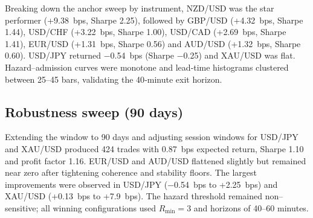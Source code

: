 \documentclass[11pt]{article}
\begin{document}
Breaking down the anchor sweep by instrument, NZD/USD was the star
performer (+9.38 bps, Sharpe 2.25), followed by GBP/USD (+4.32 bps,
Sharpe 1.44), USD/CHF (+3.22 bps, Sharpe 1.00), USD/CAD (+2.69 bps,
Sharpe 1.41), EUR/USD (+1.31 bps, Sharpe 0.56) and AUD/USD (+1.32 bps,
Sharpe 0.60).  USD/JPY returned −0.54 bps (Sharpe −0.25) and XAU/USD
was flat.  Hazard–admission curves were monotone and lead‐time
histograms clustered between 25–45 bars, validating the 40‐minute
exit horizon\cite{reference_anchor}.

\subsection{Robustness sweep (90 days)}
Extending the window to 90 days and adjusting session windows for
USD/JPY and XAU/USD produced 424 trades with 0.87 bps expected
return, Sharpe 1.10 and profit factor 1.16.  EUR/USD and
AUD/USD flattened slightly but remained near zero after tightening
coherence and stability floors.  The largest improvements were
observed in USD/JPY (−0.54 bps to +2.25 bps) and XAU/USD (+0.13 bps
to +7.9 bps).  The hazard threshold remained non–sensitive; all
winning configurations used $R_{\min}=3$ and horizons of 40–60 minutes.
\end{document}
